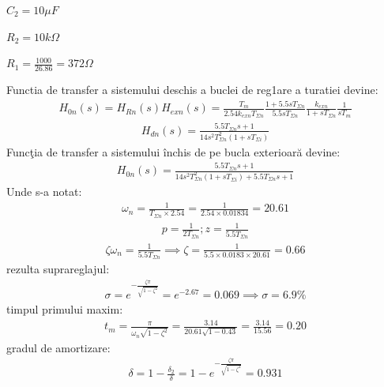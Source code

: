 \documentclass[11pt]{article}
\begin{document}
$C_2=10\mu F$

$R_2=10 k\Omega$

$R_1=\frac{1000}{26.86}=372\Omega$

Functia de transfer a sistemului deschis a buclei de reg1are a turatiei devine:
\begin{align*}
H_{0n}(s)=H_{Rn}(s)H_{exn}(s)=\frac{T_m}{2.54k_{exn}T_{\Sigma n}}\frac{1+5.5sT_{\Sigma n}}{5.5sT_{\Sigma n}}\frac{k_{exn}}{1+sT_{\Sigma n}}\frac{1}{sT_m}
\end{align*}
\begin{align*}
H_{dn}(s)=\frac{5.5T_{\Sigma n}s+1}{14s^2T_{\Sigma n}^2(1+sT_{\Sigma i})}
\end{align*}
Funcţia de transfer a sistemului închis de pe bucla exterioară devine:
\begin{align*}
H_{0n}(s)=\frac{5.5T_{\Sigma n}s+1}{14s^2T_{\Sigma n}^2(1+sT_{\Sigma i})+5.5T_{\Sigma n}s+1}
\end{align*}
Unde s-a notat:
\begin{align*}
\omega_n=\frac{1}{T_{\Sigma n}\times 2.54}=\frac{1}{2.54 \times 0.01834}=20.61
\end{align*}
\begin{align*}
p=\frac{1}{2T_{\Sigma n}};z=\frac{1}{5.5T_{\Sigma n}}
\end{align*}
\begin{align*}
\zeta \omega_n=\frac{1}{5.5T_{\Sigma n}}\implies \zeta=\frac{1}{5.5 \times 0.0183\times 20.61}=0.66
\end{align*}
rezulta suprareglajul:
\begin{align*}
\sigma=e^{-\frac{\zeta \pi}{\sqrt{1-\zeta^2}}}=e^{-2.67}=0.069\implies\sigma=6.9 \%
\end{align*}
timpul primului maxim:
\begin{align*}
t_m=\frac{\pi}{\omega_n\sqrt{1-\zeta^2}}=\frac{3.14}{20.61\sqrt{1-0.43}}=\frac{3.14}{15.56}=0.20
\end{align*}
gradul de amortizare:
\begin{align*}
\delta=1-\frac{\delta_2}{\delta}=1-e^{-\frac{\zeta \pi}{\sqrt{1-\zeta^2}}}=0.931
\end{align*}
\newpage
\nocite{*}


\end{document}
